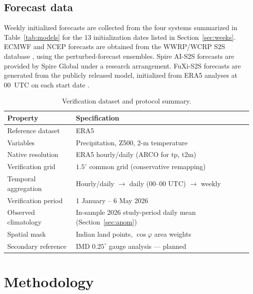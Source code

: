 \documentclass[11pt]{article}
\begin{document}
\subsection{Forecast data}\label{sec:fcstdata}

Weekly initialized forecasts are collected from the four systems
summarized in Table~\ref{tab:models} for the 13 initialization dates
listed in Section~\ref{sec:weeks}. ECMWF and NCEP forecasts are
obtained from the WWRP/WCRP S2S database \citep{vitart2017}, using the
perturbed-forecast ensembles. Spire AI-S2S forecasts are provided by
Spire Global under a research arrangement. FuXi-S2S forecasts are
generated from the publicly released model, initialized from ERA5
analyses at 00~UTC on each start date \citep{chen2024}.

\begin{table}[t]
  \caption{Verification dataset and protocol summary.}
  \label{tab:verif}
  \centering
  \small
  \begin{tabular}{ll}
    \toprule
    Property & Specification \\
    \midrule
    Reference dataset        & ERA5 \citep{hersbach2020} \\
    Variables                & Precipitation, Z500, 2-m temperature \\
    Native resolution        & ERA5 hourly/daily (ARCO for tp, t2m) \\
    Verification grid        & $1.5^{\circ}$ common grid (conservative remapping) \\
    Temporal aggregation     & Hourly/daily $\rightarrow$ daily (00--00 UTC) $\rightarrow$ weekly \\
    Verification period      & 1 January -- 6 May 2026 \\
    Observed climatology     & In-sample 2026 study-period daily mean (Section~\ref{sec:anom}) \\
    Spatial mask             & Indian land points, $\cos\varphi$ area weights \\
    Secondary reference      & IMD $0.25^{\circ}$ gauge analysis \citep{pai2014} --- planned \\
    \bottomrule
  \end{tabular}
\end{table}

\section{Methodology}\label{sec:method}
\end{document}
